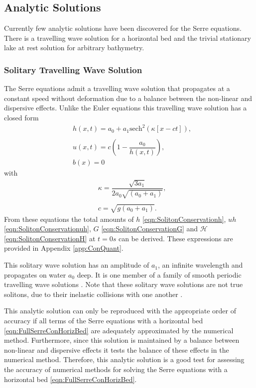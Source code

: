 \subsection{Analytic Solutions}
Currently few analytic solutions have been discovered for the Serre equations. There is a travelling wave solution for a horizontal bed \cite{El-etal-2006} and the trivial stationary lake at rest solution for arbitrary bathymetry.


\subsubsection{Solitary Travelling Wave Solution}
The Serre equations admit a travelling wave solution that propagates at a constant speed without deformation due to a balance between the non-linear and dispersive effects. Unlike the Euler equations this travelling wave solution has a closed form
\begin{subequations}
	\begin{align}
	&h(x,t) = a_0 + a_1\text{sech}^2\left(\kappa \left[x - ct\right]\right), \\  \nonumber \\
	&u(x,t) = c\left(1 - \dfrac{a_0}{h(x,t)}\right), \\
	&b(x) = 0
	\end{align}
	\label{eqn:Solitondefhub}
\end{subequations}
with
\begin{align*}
&\kappa = \dfrac{\sqrt{3a_1}}{2 a_0\sqrt{\left(a_0 + a_1\right)}}, \\ \\
&c = \sqrt{g(a_0 + a_1)}.
\end{align*}
From these equations the total amounts of $h$ \eqref{eqn:SolitonConservationh}, $uh$ \eqref{eqn:SolitonConservationuh}, $G$ \eqref{eqn:SolitonConservationG} and $\mathcal{H}$ \eqref{eqn:SolitonConservationH} at $t=0s$ can be derived. These expressions are provided in Appendix \ref{app:ConQuant}.

This solitary wave solution has an amplitude of $a_1$, an infinite wavelength and propagates on water $a_0$ deep. It is one member of a family of smooth periodic travelling wave solutions \cite{El-etal-2006}. Note that these solitary wave solutions are not true solitons, due to their inelastic collisions with one another \cite{Dutykh-etal-2013-761}. 

This analytic solution can only be reproduced with the appropriate order of accuracy if all terms of the Serre equations with a horizontal bed \eqref{eqn:FullSerreConHorizBed} are adequately approximated by the numerical method. Furthermore, since this solution is maintained by a balance between non-linear and dispersive effects it tests the balance of these effects in the numerical method. Therefore, this analytic solution is a good test for assessing the accuracy of numerical methods for solving the Serre equations with a horizontal bed \eqref{eqn:FullSerreConHorizBed}.

